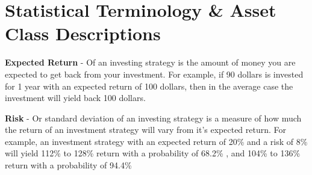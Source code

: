 \documentclass{article}
\begin{document}
\newpage

\section{Statistical Terminology \& Asset Class Descriptions}

\textbf{Expected Return} - Of an investing strategy is the amount of money you are expected to get back from your investment. For example, if 90 dollars is invested for 1 year with an expected return of 100 dollars, then in the average case the investment will yield back 100 dollars.


\vspace{.5cm}

\noindent \textbf{Risk} - Or standard deviation of an investing strategy is a measure of how much the return of an investment strategy will vary from it's expected return. For example, an investment strategy with an expected return of 20\% and a risk of 8\% will yield 112\% to 128\% return with a probability of 68.2\% , and 104\% to 136\% return with a probability of 94.4\%
\end{document}
